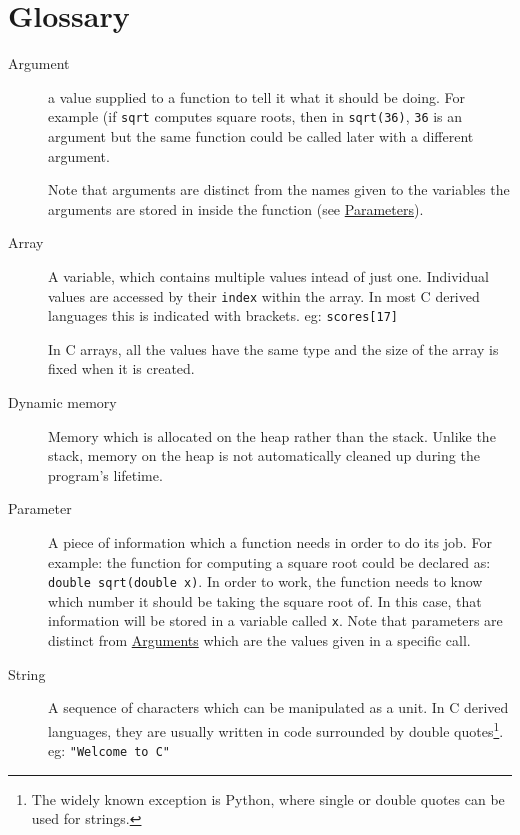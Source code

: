 
\chapter*{Glossary}

\begin{description}
 \item[\hypertarget{defn:argument}{Argument}] a value supplied to a function to tell it what it should be doing.
     For example (if \texttt{sqrt} computes square roots, then in \lstinline{sqrt(36)}, \texttt{36} is an argument but the same function
 could be called later with a different argument.
 
 Note that arguments are distinct from the names given to the variables the arguments are stored in inside the function (see \hyperlink{defn:parameter}{Parameters}).
 
 \item[\hypertarget{defn:array}{Array}] A variable, which contains multiple values intead of just one. 
 Individual values are accessed by their \texttt{index} within the array.
 In most C derived languages this is indicated with brackets.
 eg:
    \lstinline!scores[17]!
    
 In C arrays, all the values have the same type and the size of the array is fixed 
 when it is created.
 
 \item [\hypertarget{defn:dynamicmemory}{Dynamic memory}] Memory which is allocated on the heap rather than the stack.
 Unlike the stack, memory on the heap is not automatically cleaned up during the program's lifetime.
 
 \item[\hypertarget{defn:parameter}{Parameter}] A piece of information which a function needs in order to do its job.
 For example: the function for computing a square root could be declared as:
 \lstinline!double sqrt(double x)!.
 In order to work, the function needs to know which number it should be taking the square root of.
 In this case, that information will be stored in a variable called \texttt{x}.
 Note that parameters are distinct from \hyperlink{defn:argument}{Arguments} which are the values given in a specific call.
 
 \item[\hypertarget{defn:string}{String}] A sequence of characters which can be manipulated as a unit.
 In C derived languages, they are usually written in code surrounded by double quotes\footnote{The widely known exception 
 is Python, where single or double quotes can be used for strings.}.
 eg:
 \lstinline!"Welcome to C"!
\end{description}
